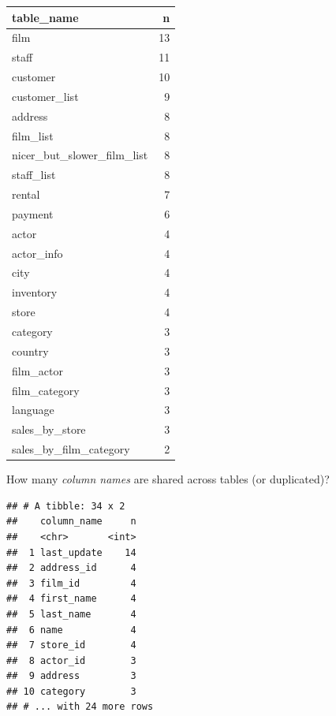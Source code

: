 \documentclass[]{book}
\newenvironment{Shaded}{\begin{snugshade}}{\end{snugshade}}
\newcommand{\DataTypeTok}[1]{\textcolor[rgb]{0.13,0.29,0.53}{#1}}
\newcommand{\DecValTok}[1]{\textcolor[rgb]{0.00,0.00,0.81}{#1}}
\newcommand{\KeywordTok}[1]{\textcolor[rgb]{0.13,0.29,0.53}{\textbf{#1}}}
\newcommand{\NormalTok}[1]{#1}
\newcommand{\OperatorTok}[1]{\textcolor[rgb]{0.81,0.36,0.00}{\textbf{#1}}}
\newcommand{\OtherTok}[1]{\textcolor[rgb]{0.56,0.35,0.01}{#1}}
\newcommand{\StringTok}[1]{\textcolor[rgb]{0.31,0.60,0.02}{#1}}
\theoremstyle{definition}
\theoremstyle{definition}
\theoremstyle{definition}
\theoremstyle{remark}
\begin{document}
\begin{tabular}{l|r}
\hline
table\_name & n\\
\hline
film & 13\\
\hline
staff & 11\\
\hline
customer & 10\\
\hline
customer\_list & 9\\
\hline
address & 8\\
\hline
film\_list & 8\\
\hline
nicer\_but\_slower\_film\_list & 8\\
\hline
staff\_list & 8\\
\hline
rental & 7\\
\hline
payment & 6\\
\hline
actor & 4\\
\hline
actor\_info & 4\\
\hline
city & 4\\
\hline
inventory & 4\\
\hline
store & 4\\
\hline
category & 3\\
\hline
country & 3\\
\hline
film\_actor & 3\\
\hline
film\_category & 3\\
\hline
language & 3\\
\hline
sales\_by\_store & 3\\
\hline
sales\_by\_film\_category & 2\\
\hline
\end{tabular}

How many \emph{column names} are shared across tables (or duplicated)?

\begin{Shaded}
\end{Shaded}

\begin{verbatim}
## # A tibble: 34 x 2
##    column_name     n
##    <chr>       <int>
##  1 last_update    14
##  2 address_id      4
##  3 film_id         4
##  4 first_name      4
##  5 last_name       4
##  6 name            4
##  7 store_id        4
##  8 actor_id        3
##  9 address         3
## 10 category        3
## # ... with 24 more rows
\end{verbatim}
\end{document}
